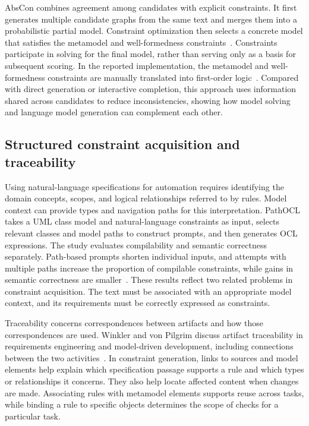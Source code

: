 \documentclass[pdflatex,iicol,sn-mathphys-num]{sn-jnl}
\newcommand{\paperref}[1]{~\citep{#1}}
\begin{document}
AbsCon combines agreement among candidates with explicit constraints. It first generates multiple candidate graphs from the same text and merges them into a probabilistic partial model. Constraint optimization then selects a concrete model that satisfies the metamodel and well-formedness constraints\paperref{Chen_2025}. Constraints participate in solving for the final model, rather than serving only as a basis for subsequent scoring. In the reported implementation, the metamodel and well-formedness constraints are manually translated into first-order logic\paperref{Chen_2025}. Compared with direct generation or interactive completion, this approach uses information shared across candidates to reduce inconsistencies, showing how model solving and language model generation can complement each other.

\subsection{Structured constraint acquisition and traceability}\label{sec:related-2-3}

Using natural-language specifications for automation requires identifying the domain concepts, scopes, and logical relationships referred to by rules. Model context can provide types and navigation paths for this interpretation. PathOCL takes a UML class model and natural-language constraints as input, selects relevant classes and model paths to construct prompts, and then generates OCL expressions. The study evaluates compilability and semantic correctness separately. Path-based prompts shorten individual inputs, and attempts with multiple paths increase the proportion of compilable constraints, while gains in semantic correctness are smaller\paperref{Abukhalaf_2024}. These results reflect two related problems in constraint acquisition. The text must be associated with an appropriate model context, and its requirements must be correctly expressed as constraints.

Traceability concerns correspondences between artifacts and how those correspondences are used. Winkler and von Pilgrim discuss artifact traceability in requirements engineering and model-driven development, including connections between the two activities\paperref{Winkler2010}. In constraint generation, links to sources and model elements help explain which specification passage supports a rule and which types or relationships it concerns. They also help locate affected content when changes are made. Associating rules with metamodel elements supports reuse across tasks, while binding a rule to specific objects determines the scope of checks for a particular task.
\end{document}

